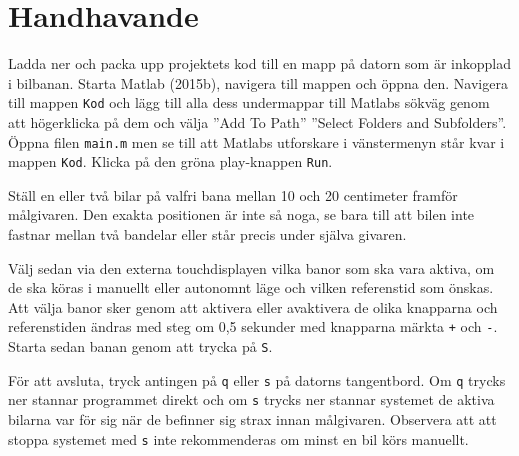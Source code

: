 \section{Handhavande}
\label{app:handhavande}

Ladda ner och packa upp projektets kod till en mapp på datorn som är inkopplad i
bilbanan. Starta Matlab (2015b), navigera till mappen och öppna den.
Navigera till mappen \texttt{Kod} och lägg till alla dess undermappar till Matlabs
sökväg genom att högerklicka på dem och välja ''Add To Path'' \textrightarrow
''Select Folders and Subfolders''. Öppna filen \texttt{main.m} men se till att
Matlabs utforskare i vänstermenyn står kvar i mappen \texttt{Kod}. Klicka på
den gröna play-knappen \texttt{Run}.


Ställ en eller två bilar på valfri bana mellan 10 och 20 centimeter framför
målgivaren. Den exakta positionen är inte så noga, se bara till att bilen inte
fastnar mellan två bandelar eller står precis under själva givaren.

Välj sedan via den externa touchdisplayen vilka banor som ska vara aktiva, om de
ska köras i manuellt eller autonomnt läge och vilken referenstid som önskas.
Att välja banor sker genom att aktivera eller avaktivera de olika knapparna och
referenstiden ändras med steg om 0,5 sekunder med knapparna märkta \texttt{+}
och \texttt{-}. Starta sedan banan genom att trycka på \texttt{S}.


För att avsluta, tryck antingen på \texttt{q} eller \texttt{s} på datorns
tangentbord. Om \texttt{q} trycks ner stannar programmet direkt och om
\texttt{s} trycks ner stannar systemet de aktiva bilarna var för sig när de
befinner sig strax innan målgivaren. Observera att att stoppa systemet med
\texttt{s} inte rekommenderas om minst en bil körs manuellt.

